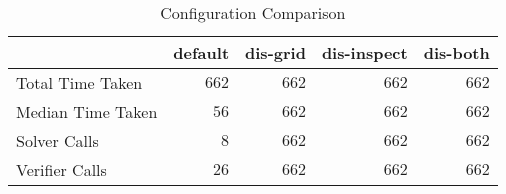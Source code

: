 \begin{table}[htp]
\caption{Configuration Comparison}
\label{Ta:configuration_comparison}
\begin{center}

\def\arraystretch{1.1}
\setlength\tabcolsep{7pt}

\begin{tabular}{|l|r|r|r|r|}
\hline

\multicolumn{1}{|c|}{} & \multicolumn{1}{|c|}{\textbf{default}} & \multicolumn{1}{|c|}{\textbf{dis-grid}} & \multicolumn{1}{|c|}{\textbf{dis-inspect}} & \multicolumn{1}{|c|}{\textbf{dis-both}} \\ \hline \hline
Total Time Taken & $662$ & $662$ & $662$ & $662$\\ \hline
Median Time Taken & $56$ & $662$ & $662$ & $662$\\ \hline
Solver Calls & $8$ & $662$ & $662$ & $662$\\ \hline
Verifier Calls & $26$ & $662$ & $662$ & $662$\\ \hline

\end{tabular}

\end{center}
\end{table}
